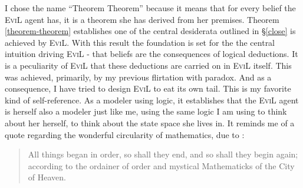 I chose the name ``Theorem Theorem'' because it means that for every belief the \textsc{EviL} agent has, it is a theorem she has derived from her premises. Theorem \ref{theorem-theorem} establishes one of the central desiderata outlined in \S\ref{close} is achieved by \textsc{EviL}.  With this result the foundation is set for the the central intuition driving \textsc{EviL} - that beliefs are the consequences of logical deductions.  It is a peculiarity of \textsc{EviL} that these deductions are carried on in \textsc{EviL} itself.  This was achieved, primarily, by my previous flirtation with paradox.  And as a consequence, I have tried to design \textsc{EviL} to eat its own tail. This is my favorite kind of self-reference. As a modeler using logic, it establishes that the \textsc{EviL} agent is herself also a modeler just like me, using the same logic I am using to think about her herself, to think about the state space she lives in.  It reminds me of a quote regarding the wonderful circularity of mathematics, due to \citet{browne_garden_1736}:
\begin{quote}
All things began in order, so shall they end, and so shall they begin again; according to the ordainer of order and mystical Mathematicks of the City of Heaven.\end{quote}


